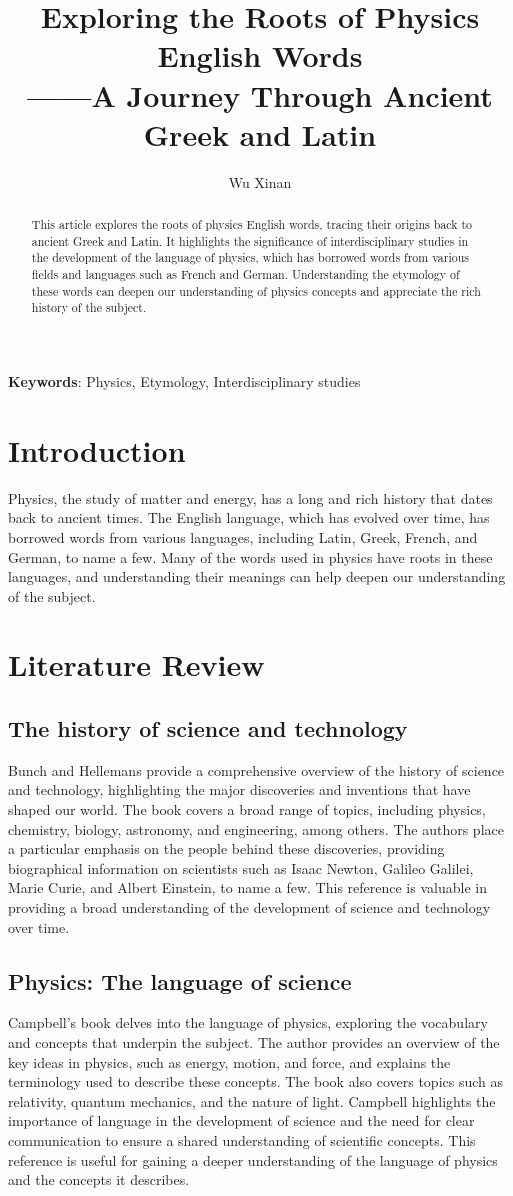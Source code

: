 \documentclass{phyasgn}\usepackage{nag}
\title{
  {Exploring the Roots of Physics English Words}\\[-8pt]
    {\normalsize ——A Journey Through Ancient Greek and Latin}
}
\author{Wu Xinan}
\date{}
\newcommand\keywords[1]{\textbf{Keywords}: #1}
\begin{document}
\maketitle

\begin{abstract}
\vspace{-1.3em}
This article explores the roots of physics English words, tracing their origins back to ancient Greek and Latin. It highlights the significance of interdisciplinary studies in the development of the language of physics, which has borrowed words from various fields and languages such as French and German. Understanding the etymology of these words can deepen our understanding of physics concepts and appreciate the rich history of the subject. 
\end{abstract}
\keywords{Physics, Etymology, Interdisciplinary studies}
\tableofcontents
\section{Introduction}
Physics, the study of matter and energy, has a long and rich history that dates back to ancient times. The English language, which has evolved over time, has borrowed words from various languages, including Latin, Greek, French, and German, to name a few. Many of the words used in physics have roots in these languages, and understanding their meanings can help deepen our understanding of the subject.
\section{Literature Review}
\subsection{The history of science and technology\cite{1}}
Bunch and Hellemans provide a comprehensive overview of the history of science and technology, highlighting the major discoveries and inventions that have shaped our world. The book covers a broad range of topics, including physics, chemistry, biology, astronomy, and engineering, among others. The authors place a particular emphasis on the people behind these discoveries, providing biographical information on scientists such as Isaac Newton, Galileo Galilei, Marie Curie, and Albert Einstein, to name a few. This reference is valuable in providing a broad understanding of the development of science and technology over time.
\subsection{Physics: The language of science\cite{2}}
Campbell's book delves into the language of physics, exploring the vocabulary and concepts that underpin the subject. The author provides an overview of the key ideas in physics, such as energy, motion, and force, and explains the terminology used to describe these concepts. The book also covers topics such as relativity, quantum mechanics, and the nature of light. Campbell highlights the importance of language in the development of science and the need for clear communication to ensure a shared understanding of scientific concepts. This reference is useful for gaining a deeper understanding of the language of physics and the concepts it describes.
\end{document}
